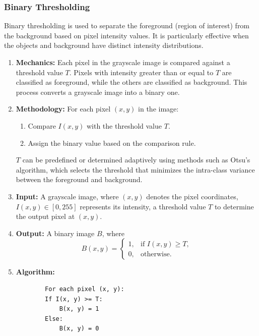 \documentclass[conference]{IEEEtran}
\begin{document}
\subsubsection{Binary Thresholding}
Binary thresholding is used to separate the foreground (region of interest) from the background based on pixel intensity values. It is particularly effective when the objects and background have distinct intensity distributions.

\begin{enumerate}
	\item \textbf{Mechanics:} Each pixel in the grayscale image is compared against a threshold value $T$. Pixels with intensity greater than or equal to $T$ are classified as foreground, while the others are classified as background. This process converts a grayscale image into a binary one.
	
	\item \textbf{Methodology:}
	For each pixel $(x, y)$ in the image:
	\begin{enumerate}
		\item Compare $I(x, y)$ with the threshold value $T$.
		\item Assign the binary value based on the comparison rule.
	\end{enumerate}
	$T$ can be predefined or determined adaptively using methods such as Otsu’s algorithm, which selects the threshold that minimizes the intra-class variance between the foreground and background.
	
	\item \textbf{Input:} A grayscale image, where $(x, y)$ denotes the pixel coordinates, $I(x, y) \in [0, 255]$ represents its intensity, a threshold value $T$ to determine the output pixel at $(x, y)$.
	
	\item \textbf{Output:} A binary image $B$, where
	\[
	B(x, y) = 
	\begin{cases} 
		1, & \text{if } I(x, y) \ge T, \\
		0, & \text{otherwise.}
	\end{cases}
	\]
	
	\item \textbf{Algorithm:}
	\begin{lstlisting}
		For each pixel (x, y):
		If I(x, y) >= T:
			B(x, y) = 1
		Else:
			B(x, y) = 0
	\end{lstlisting}
\end{enumerate}
\end{document}
